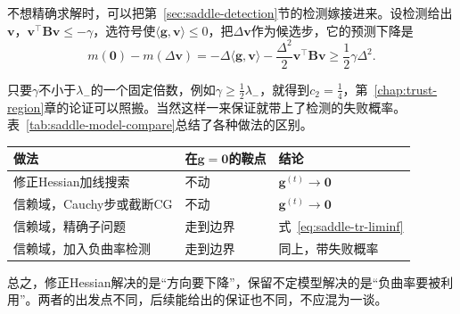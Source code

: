 不想精确求解时，可以把第~\ref{sec:saddle-detection}节的检测嫁接进来。设检测给出$\bm{v}$，$\bm{v}^\top\bm{B}\bm{v}\leq-\gamma$，选符号使$\langle\bm{g},\bm{v}\rangle\leq0$，把$\Delta\bm{v}$作为候选步，它的预测下降是
\[
 m(\bm{0})-m(\Delta\bm{v})=-\Delta\langle\bm{g},\bm{v}\rangle-\frac{\Delta^2}{2}\bm{v}^\top\bm{B}\bm{v}\geq\frac12\gamma\Delta^2.
\]

只要$\gamma$不小于$\lambda_-$的一个固定倍数，例如$\gamma\geq\tfrac12\lambda_-$，就得到$c_2=\tfrac14$，第~\ref{chap:trust-region}章的论证可以照搬。当然这样一来保证就带上了检测的失败概率。表~\ref{tab:saddle-model-compare}总结了各种做法的区别。

\begin{BookInlineTable}
  \centering
  \begin{tabular}{@{}lll@{}}
    \toprule
    做法 & 在$\bm{g}=\bm{0}$的鞍点 & 结论\\
    \midrule
    修正Hessian加线搜索 & 不动 & $\bm{g}^{(t)}\to\bm{0}$\\
    信赖域，Cauchy步或截断CG & 不动 & $\bm{g}^{(t)}\to\bm{0}$\\
    信赖域，精确子问题 & 走到边界 & 式~\eqref{eq:saddle-tr-liminf}\\
    信赖域，加入负曲率检测 & 走到边界 & 同上，带失败概率\\
    \bottomrule
  \end{tabular}
  \caption{几种处理不定矩阵的做法。式~\eqref{eq:saddle-tr-liminf}的二阶结论只说明子列满足二阶必要条件，不说明极限点是局部极小点。}
  \label{tab:saddle-model-compare}
\end{BookInlineTable}

总之，修正Hessian解决的是“方向要下降”，保留不定模型解决的是“负曲率要被利用”。两者的出发点不同，后续能给出的保证也不同，不应混为一谈。

